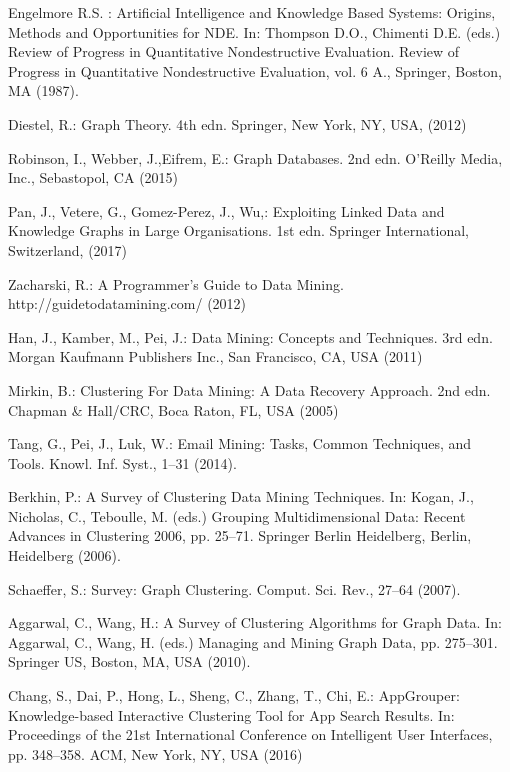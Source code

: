 \documentclass[runningheads]{llncs}
\begin{document}
\begin{thebibliography}{8}
Engelmore R.S.  : Artificial Intelligence and Knowledge Based Systems: Origins, Methods and Opportunities for NDE. In: Thompson D.O., Chimenti D.E. (eds.) Review of Progress in Quantitative Nondestructive Evaluation. Review of Progress in Quantitative Nondestructive Evaluation, vol. 6 A., 
Springer, Boston, MA (1987). 

Diestel, R.: Graph Theory. 4th edn. Springer, New York, NY, USA, (2012)

Robinson, I., Webber, J.,Eifrem, E.: Graph Databases. 2nd edn. O'Reilly Media, Inc., Sebastopol, CA (2015)

Pan, J., Vetere, G., Gomez-Perez, J., Wu,: Exploiting Linked Data and Knowledge Graphs in Large Organisations. 1st edn. Springer International, Switzerland, (2017)

Zacharski, R.: A Programmer's Guide to Data Mining. http://guidetodatamining.com/ (2012)

Han, J., Kamber, M., Pei, J.: Data Mining: Concepts and Techniques. 3rd edn. Morgan Kaufmann Publishers Inc.,
San Francisco, CA, USA (2011)

Mirkin, B.: Clustering For Data Mining: A Data Recovery Approach. 2nd edn. Chapman \& Hall/CRC,
Boca Raton, FL, USA (2005)

Tang, G., Pei, J., Luk, W.: Email Mining: Tasks, Common Techniques, and Tools. Knowl. Inf. Syst., 1--31 (2014). 

Berkhin, P.: A Survey of Clustering Data Mining Techniques. In: Kogan, J., Nicholas, C., Teboulle, M. (eds.) Grouping Multidimensional Data: Recent Advances in Clustering 2006, pp. 25--71.
Springer Berlin Heidelberg, Berlin, Heidelberg (2006). 

Schaeffer, S.: Survey: Graph Clustering. Comput. Sci. Rev., 27--64 (2007). 

Aggarwal, C., Wang, H.: A Survey of Clustering Algorithms for Graph Data. In: Aggarwal, C., Wang, H. (eds.) Managing and Mining Graph Data, pp. 275--301.
Springer US, Boston, MA, USA (2010). 

Chang, S., Dai, P., Hong, L., Sheng, C., Zhang, T., Chi, E.: AppGrouper: Knowledge-based Interactive Clustering Tool for App Search Results. In: Proceedings of the 21st International Conference on Intelligent User Interfaces, pp. 348--358. ACM, New York, NY, USA (2016) 


\end{thebibliography}
\end{document}
